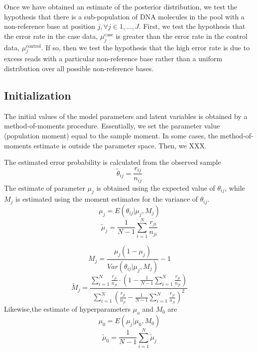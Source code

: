 \documentclass[11pt,reqno]{amsart}
\begin{document}
Once we have obtained an estimate of the posterior distribution, we test the hypothesis that there is a sub-population of DNA molecules in the pool with a non-reference base at position $j, \forall j \in 1, \ldots, J$. First, we test the hypothesis that the error rate in the case data, $\mu_j^{\text{case}}$ is greater than the error rate in the control data, $\mu_j^{\text{control}}$. If so, then we test the hypothesis that the high error rate is due to excess reads with a particular non-reference base rather than a uniform distribution over all possible non-reference bases.

\subsection{Initialization}
The initial values of the model parameters and latent variables is obtained by a method-of-moments procedure. Essentially, we set the parameter value (population moment) equal to the sample moment. In some cases, the method-of-moments estimate is outside the parameter space. Then, we XXX.

The estimated error probability is calculated from the observed sample
\begin{equation}
 \tilde{\theta}_{ij}=\frac{r_{ij}}{n_{ij}}
\end{equation}
The estimate of parameter $\mu_j$ is obtained using the expected value of $\theta_{ij}$, while $M_j$ is estimated using the moment estimates for the variance of $\theta_{ij}$.
\begin{equation}
 \mu_j=E(\theta_{ij}|\mu_j,M_j)
\end{equation}
\begin{equation}
 \tilde{\mu}_j =\frac{1}{N-1}\sum_{i=1}^N\frac{r_{ji}}{n_{ji}}
\end{equation}

\begin{equation}
 M_j=\frac{\mu_j(1-\mu_j)}{Var(\theta_{ij}|\mu_j,M_j)}-1
\end{equation}
\begin{equation}
 \tilde{M}_j = \frac{\sum_{i=1}^N\frac{r_{ji}}{n_{ji}}\cdot\left(1-\frac{1}{N-1}\sum_{i=1}^N\frac{r_{ji}}{n_{ji}}\right)}{\sum_{i=1}^N\left(\frac{r_{ji}}{n_{ji}}-\frac{1}{N-1}\sum_{i=1}^N\frac{r_{ji}}{n_{ji}}\right)^2}
\end{equation}
Likewise,the estimate of hyperparameters $\mu_o$ and $M_0$ are
\begin{equation}
 \mu_0=E(\mu_j|\mu_0,M_0)
\end{equation}
\begin{equation}
 \tilde{\mu}_0 =\frac{1}{N-1}\sum_{i=1}^N\tilde{\mu}_j
\end{equation}
\end{document}

